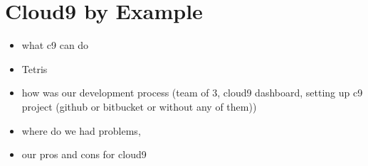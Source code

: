 \section{Cloud9 by Example}
\label{sec:Motivation}

\begin{itemize}
	\item what c9 can do
	\item Tetris
	\item how was our development process (team of 3, cloud9 dashboard, setting up c9 project (github or bitbucket or without any of them))
	\item where do we had problems,
	\item our pros and cons for cloud9
\end{itemize}

